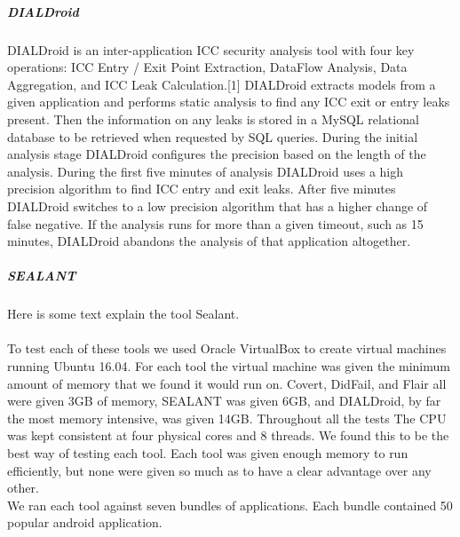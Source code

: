 \documentclass[twocolumn]{article}
\begin{document}
	\subparagraph{DIALDroid}
		DIALDroid is an inter-application ICC security analysis tool with four key operations: ICC Entry / Exit Point Extraction, DataFlow Analysis, Data Aggregation, and ICC Leak Calculation.[1] DIALDroid extracts models from a given application and performs static analysis to find any ICC exit or entry leaks present. Then the information on any leaks is stored in a MySQL relational database to be retrieved when requested by SQL queries. During the initial analysis stage DIALDroid configures the precision based on the length of the analysis. During the first five minutes of analysis DIALDroid uses a high precision algorithm to find ICC entry and exit leaks. After five minutes DIALDroid switches to a low precision algorithm that has a higher change of false negative. If the analysis runs for more than a given timeout, such as 15 minutes, DIALDroid abandons the analysis of that application altogether.
	\subparagraph{SEALANT}
		Here is some text explain the tool Sealant.
\paragraph*{}
	To test each of these tools we used Oracle VirtualBox to create virtual machines running Ubuntu 16.04. For each tool the virtual machine was given the minimum amount of memory that we found it would run on. Covert, DidFail, and Flair all were given 3GB of memory, SEALANT was given 6GB, and DIALDroid, by far the most memory intensive, was given 14GB. Throughout all the tests The CPU was kept consistent at four physical cores and 8 threads. We found this to be the best way of testing each tool. Each tool was given enough memory to run efficiently, but none were given so much as to have a clear advantage over any other.\\ 
	We ran each tool against seven bundles of applications. Each bundle contained 50 popular android application.
\end{document}
